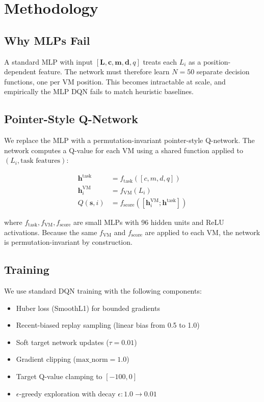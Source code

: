 \documentclass[conference]{IEEEtran}
\begin{document}
\section{Methodology}

\subsection{Why MLPs Fail}

A standard MLP with input $[\mathbf{L}, \mathbf{c}, \mathbf{m}, \mathbf{d}, q]$ treats each $L_i$ as a position-dependent feature. The network must therefore learn $N=50$ separate decision functions, one per VM position. This becomes intractable at scale, and empirically the MLP DQN fails to match heuristic baselines.

\subsection{Pointer-Style Q-Network}

We replace the MLP with a permutation-invariant pointer-style Q-network. The network computes a Q-value for each VM using a shared function applied to $(L_i, \text{task features})$:

\begin{align}
\mathbf{h}^{\text{task}} &= f_{\text{task}}([c, m, d, q]) \\
\mathbf{h}_i^{\text{VM}} &= f_{\text{VM}}(L_i) \\
Q(\mathbf{s}, i) &= f_{\text{score}}([\mathbf{h}_i^{\text{VM}}; \mathbf{h}^{\text{task}}])
\end{align}

where $f_{\text{task}}, f_{\text{VM}}, f_{\text{score}}$ are small MLPs with 96 hidden units and ReLU activations. Because the same $f_{\text{VM}}$ and $f_{\text{score}}$ are applied to each VM, the network is permutation-invariant by construction.

\subsection{Training}

We use standard DQN training with the following components:
\begin{itemize}
    \item Huber loss (SmoothL1) for bounded gradients
    \item Recent-biased replay sampling (linear bias from 0.5 to 1.0)
    \item Soft target network updates ($\tau=0.01$)
    \item Gradient clipping ($\text{max\_norm}=1.0$)
    \item Target Q-value clamping to $[-100, 0]$
    \item $\epsilon$-greedy exploration with decay $\epsilon: 1.0 \to 0.01$
\end{itemize}
\end{document}
